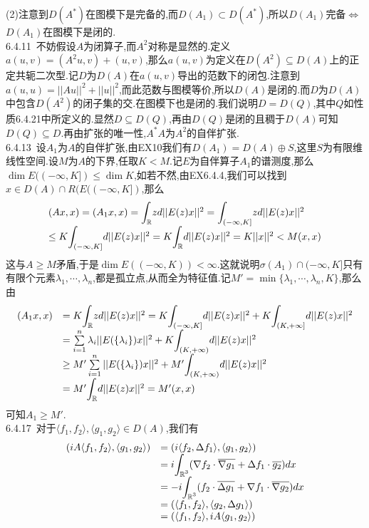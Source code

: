 \documentclass[b5paper]{ctexart}
\begin{document}
(2)注意到$D(A^*)$在图模下是完备的,而$D(A_1)\subset D(A^*)$,所以$D(A_1)$完备$\Leftrightarrow$$D(A_1)$在图模下是闭的.\\
6.4.11~不妨假设$A$为闭算子,而$A^2$对称是显然的.定义$a(u,v)=(A^2u,v)+(u,v)$,那么$a(u,v)$为定义在$D(A^2)\subseteq D(A)$上的正定共轭二次型.记$D$为$D(A)$在$a(u,v)$导出的范数下的闭包.注意到$a(u,u)=||Au||^2+||u||^2$,而此范数与图模等价,所以$D(A)$是闭的.而$D$为$D(A)$中包含$D(A^2)$的闭子集的交.在图模下也是闭的.我们说明$D=D(Q)$,其中$Q$如性质6.4.21中所定义的.显然$D\subseteq D(Q)$,再由$D(Q)$是闭的且稠于$D(A)$可知$D(Q)\subseteq D$.再由扩张的唯一性,$A^*A$为$A^2$的自伴扩张.\\
6.4.13~设$A_1$为$A$的自伴扩张,由EX10我们有$D(A_1)=D(A)\oplus S$,这里$S$为有限维线性空间.设$M$为$A$的下界,任取$K<M$.记$E$为自伴算子$A_1$的谱测度,那么$\dim E((-\infty,K])
\leq\dim K$,如若不然,由EX6.4.4,我们可以找到$x\in D(A)\cap R(E((-\infty,K])$,那么\\
\[\begin{array}{l}
(Ax,x)=(A_1x,x)=\mathlarger{\int}_{\mathbb{R}}zd||E(z)x||^2
=\mathlarger{\int}_{(-\infty,K]}zd||E(z)x||^2\\
\leq K\mathlarger{\int}_{(-\infty,K]}d||E(z)x||^2=K\mathlarger{\int}_{\mathbb{R}}d||E(z)x||^2=K||x||^2<M(x,x)
\end{array}\]
这与$A\geq M$矛盾,于是$\dim E((-\infty,K))<\infty$.这就说明$\sigma(A_1)\cap (-\infty,K]$只有有限个元素$\lambda_1,\cdots,\lambda_n$,都是孤立点,从而全为特征值.记$M'=\min \{\lambda_1,\cdots,\lambda_n,K\}$,那么由
\[\begin{array}{rl}
(A_1x,x)&= K\mathlarger{\int}_{\mathbb{R}}zd||E(z)x||^2=K\mathlarger{\int}_{(-\infty,K]}d||E(z)x||^2+K\mathlarger{\int}_{(K,+\infty]}d||E(z)x||^2\\
&=\sum\limits_{i=1}^n\lambda_i||E(\{\lambda_i\})x||^2+K\mathlarger{\int}_{(K,+\infty)}d||E(z)x||^2\\
&\geq M'\sum\limits_{i=1}^n||E(\{\lambda_i\})x||^2+M'\mathlarger{\int}_{(K,+\infty)}d||E(z)x||^2\\
&=M'\mathlarger{\int}_{\mathbb{R}}d||E(z)x||^2=M'(x,x)
\end{array}\]
可知$A_1\geq M'$.\\
6.4.17~对于$\langle f_1,f_2\rangle,\langle g_1,g_2\rangle\in D(A)$,我们有\\
\[\begin{array}{rl}
(iA\langle f_1,f_2\rangle,\langle g_1,g_2\rangle) &=(i\langle f_2,\Delta f_1\rangle,\langle g_1,g_2\rangle)\\
&=i\mathlarger{\int}_{\mathbb{R}^3}(\nabla f_2\cdot \overline{\nabla g_1}+\Delta f_1\cdot\overline{g_2})dx\\
&=-i\mathlarger{\int}_{\mathbb{R}^3}( f_2\cdot \overline{\Delta g_1}+\nabla f_1\cdot\overline{\nabla g_2})dx\\
&=(\langle f_1,f_2\rangle,\langle g_2,\Delta g_1\rangle)\\
&=(\langle f_1,f_2\rangle,iA\langle g_1, g_2\rangle)
\end{array}\]
\end{document}
